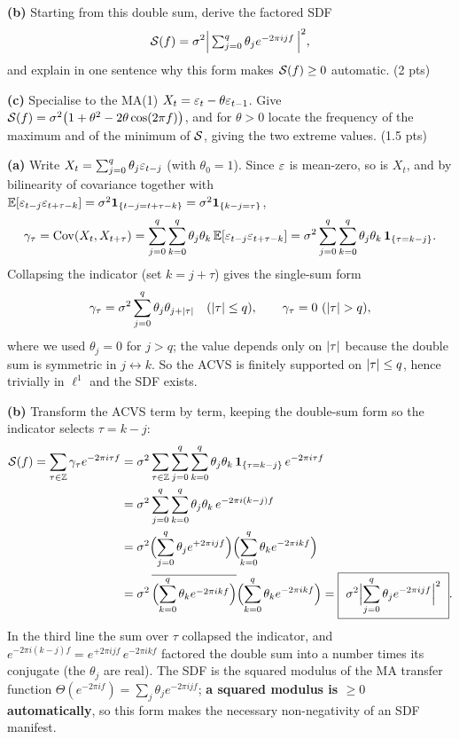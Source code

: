 \documentclass[11pt]{article}
\begin{document}
\textbf{(b)} Starting from this double sum, derive the factored SDF
\[
\mathcal{S}(f)=\sigma^2\Bigl|\,\textstyle\sum_{j=0}^{q}\theta_j e^{-2\pi i j f}\,\Bigr|^2,
\]
and explain in one sentence why this form makes $\mathcal{S}(f)\ge0$ automatic. \hfill(2 pts)

\textbf{(c)} Specialise to the MA(1) $X_t=\varepsilon_t-\theta\varepsilon_{t-1}$. Give $\mathcal{S}(f)=\sigma^2\bigl(1+\theta^2-2\theta\cos(2\pi f)\bigr)$, and for $\theta>0$ locate the frequency of the maximum and of the minimum of $\mathcal{S}$, giving the two extreme values. \hfill(1.5 pts)
\statementend

\textbf{(a)} Write $X_t=\sum_{j=0}^{q}\theta_j\varepsilon_{t-j}$ (with $\theta_0=1$). Since $\varepsilon$ is mean-zero, so is $X_t$, and by bilinearity of covariance together with $\mathbb{E}[\varepsilon_{t-j}\varepsilon_{t+\tau-k}]=\sigma^2\mathbf{1}_{\{t-j=t+\tau-k\}}=\sigma^2\mathbf{1}_{\{k-j=\tau\}}$,
\[
\gamma_\tau=\operatorname{Cov}(X_t,X_{t+\tau})
=\sum_{j=0}^{q}\sum_{k=0}^{q}\theta_j\theta_k\,\mathbb{E}[\varepsilon_{t-j}\varepsilon_{t+\tau-k}]
=\sigma^2\sum_{j=0}^{q}\sum_{k=0}^{q}\theta_j\theta_k\,\mathbf{1}_{\{\tau=k-j\}}.
\]
Collapsing the indicator (set $k=j+\tau$) gives the single-sum form
\[
\gamma_\tau=\sigma^2\sum_{j=0}^{q}\theta_j\theta_{j+\left\lvert \tau \right\rvert}\quad(\left\lvert \tau \right\rvert\le q),
\qquad \gamma_\tau=0\ (\left\lvert \tau \right\rvert>q),
\]
where we used $\theta_j=0$ for $j>q$; the value depends only on $\left\lvert \tau \right\rvert$ because the double sum is symmetric in $j\leftrightarrow k$. So the ACVS is finitely supported on $\left\lvert \tau \right\rvert\le q$, hence trivially in $\ell^1$ and the SDF exists.

\textbf{(b)} Transform the ACVS term by term, keeping the double-sum form so the indicator selects $\tau=k-j$:
\[
\begin{aligned}
\sdf(f)=\sum_{\tau\in\Ints}\acvs_\tau e^{-2\pi i\tau f}
&=\sigma^2\sum_{\tau\in\Ints}\sum_{j=0}^{q}\sum_{k=0}^{q}\theta_j\theta_k\,\ind_{\{\tau=k-j\}}\,e^{-2\pi i\tau f}\\
&=\sigma^2\sum_{j=0}^{q}\sum_{k=0}^{q}\theta_j\theta_k\,e^{-2\pi i(k-j)f}\\
&=\sigma^2\Bigl(\sum_{j=0}^{q}\theta_j e^{+2\pi i j f}\Bigr)\Bigl(\sum_{k=0}^{q}\theta_k e^{-2\pi i k f}\Bigr)\\
&=\sigma^2\,\conj{\Bigl(\sum_{k=0}^{q}\theta_k e^{-2\pi i k f}\Bigr)}\Bigl(\sum_{k=0}^{q}\theta_k e^{-2\pi i k f}\Bigr)
=\boxed{\ \sigma^2\Bigl|\sum_{j=0}^{q}\theta_j e^{-2\pi i j f}\Bigr|^2\ }.
\end{aligned}
\]
In the third line the sum over $\tau$ collapsed the indicator, and $e^{-2\pi i(k-j)f}=e^{+2\pi i j f}\,e^{-2\pi i k f}$ factored the double sum into a number times its conjugate (the $\theta_j$ are real). The SDF is the squared modulus of the MA transfer function $\Theta(e^{-2\pi i f})=\sum_j\theta_j e^{-2\pi i j f}$; \textbf{a squared modulus is $\ge0$ automatically}, so this form makes the necessary non-negativity of an SDF manifest.
\end{document}
